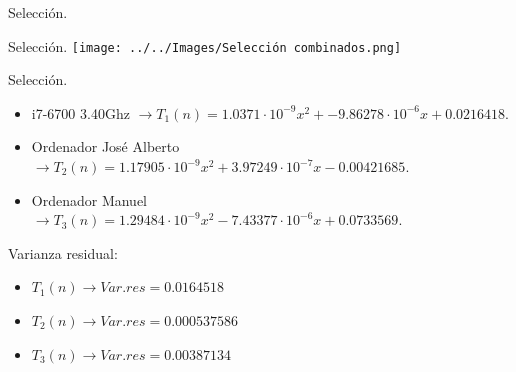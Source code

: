 \documentclass[10pt, xcolor=table]{beamer}
\begin{document}
\begin{frame}{Selección.
		}
	\begin{table}[h!]
		\centering
		\footnotesize
		\caption{Experiencia empírica de algoritmo de Selección sin optimizar}
	\end{table}
\end{frame}

\begin{frame}{Selección.
		}
	\centering
	\texttt{[image: ../../Images/Selección combinados.png]}
\end{frame}

\begin{frame}[fragile]{Selección.
		}
	\begin{itemize}
		\item i7-6700 3.40Ghz \(\rightarrow T_1(n) = 1.0371 \cdot 10^{-9} x^2 + -9.86278 \cdot 10^{-6} x +0.0216418\).
		\item Ordenador José Alberto \(\rightarrow T_2(n) = 1.17905 \cdot 10^{-9} x^2 + 3.97249 \cdot 10^{-7} x - 0.00421685\).
		\item Ordenador Manuel \(\rightarrow T_3(n) = 1.29484 \cdot 10^{-9} x^2 - 7.43377 \cdot 10^{-6} x + 0.0733569\).
	\end{itemize}
	
	Varianza residual:
	\begin{itemize}
		\item \(T_1(n) \longrightarrow Var.res = 0.0164518\)
		\item \(T_2(n) \longrightarrow Var.res = 0.000537586\)
		\item \(T_3(n) \longrightarrow Var.res = 0.00387134\)
	\end{itemize}
\end{frame}
\end{document}
